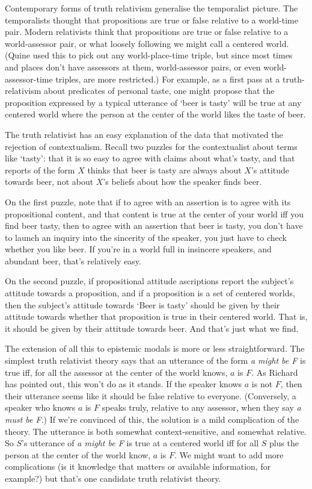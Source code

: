 Contemporary forms of truth relativism generalise the temporalist picture. The temporalists thought that propositions are true or false relative to a world-time pair. Modern relativists think that propositions are true or false relative to a world-assessor pair, or what loosely following \citet{Quine1969} we might call a centered world. (Quine used this to pick out any world-place-time triple, but since most times and places don't have assessors at them, world-assessor pairs, or even world-assessor-time triples, are more restricted.) For example, as a first pass at a truth-relativism about predicates of personal taste, one might propose that the proposition expressed by a typical utterance of `beer is tasty' will be true at any centered world where the person at the center of the world likes the taste of beer.

The truth relativist has an easy explanation of the data that motivated the rejection of contextualism. Recall two puzzles for the contextualist about terms like `tasty': that it is so easy to agree with claims about what's tasty, and that reports of the form $X$ thinks that beer is tasty are always about $X$'s attitude towards beer, not about $X$'s beliefs about how the speaker finds beer. 

On the first puzzle, note that if to agree with an assertion is to agree with its propositional content, and that content is true at the center of your world iff you find beer tasty, then to agree with an assertion that beer is tasty, you don't have to launch an inquiry into the sincerity of the speaker, you just have to check whether you like beer. If you're in a world full in insincere speakers, and abundant beer, that's relatively easy.

On the second puzzle, if propositional attitude ascriptions report the subject's attitude towards a proposition, and if a proposition is a set of centered worlds, then the subject's attitude towards `Beer is tasty' should be given by their attitude towards whether that proposition is true in their centered world. That is, it should be given by their attitude towards beer. And that's just what we find.

The extension of all this to epistemic modals is more or less straightforward. The simplest truth relativist theory says that an utterance of the form \textit{a might be F} is true iff, for all the assessor at the center of the world knows, $a$ is $F$. As Richard \citet{Dietz2008} has pointed out, this won't do as it stands. If the speaker knows $a$ is not $F$, then their utterance seems like it should be false relative to everyone. (Conversely, a speaker who knows $a$ is $F$ speaks truly, relative to any assessor, when they say \textit{a must be F}.) If we're convinced of this, the solution is a mild complication of the theory. The utterance is both somewhat context-sensitive, and somewhat relative. So $S$'s utterance of \textit{a might be F} is true at a centered world iff for all $S$ plus the person at the center of the world know, $a$ is $F$. We might want to add more complications (is it knowledge that matters or available information, for example?) but that's one candidate truth relativist theory.

